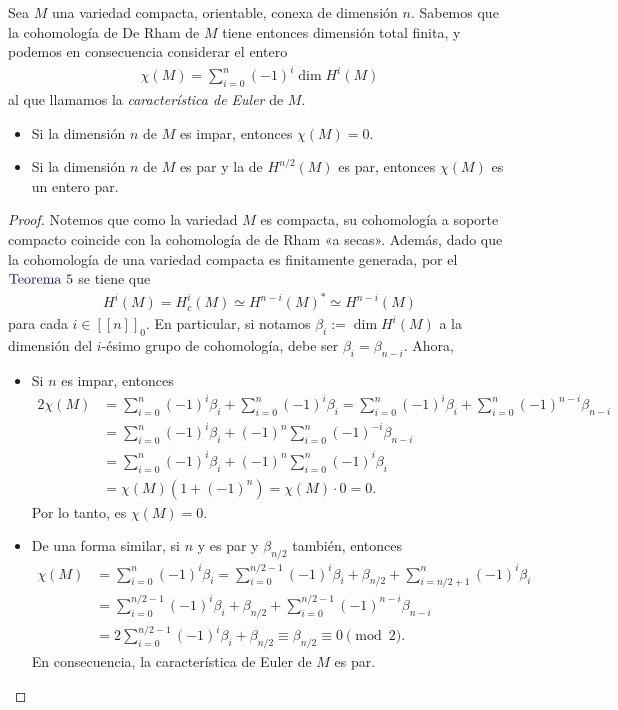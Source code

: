 \documentclass[11pt]{article}
\newcommand{\nat}[1]{[\![#1]\!]}
\newcommand{\natzero}[1]{\nat{#1}_0}
\newcommand{\paint}[1]{\color{color}{#1}}
\newcommand{\tpaing}[1]{\paint{\text{#1}}}
\newenvironment{exercise}[2][Ejercicio]{\begin{trivlist}
\item[\hskip \labelsep \paint{{\bfseries #1}}\hskip \labelsep {\bfseries #2.}]}{\end{trivlist}}
\begin{document}
\begin{exercise}{4} Sea $M$ una variedad compacta, orientable, conexa de dimensión $n$. Sabemos que la cohomología de De Rham de $M$ tiene entonces dimensión total finita, y podemos en consecuencia considerar el entero
\begin{align*}
\chi(M) = \sum_{i=0}^{n}(-1)^i \dim H^i(M)
\end{align*}
al que llamamos la \textit{característica de Euler} de $M$.
\begin{itemize}[listparindent = \parindent]
\item[(a)] Si la dimensión $n$ de $M$ es impar, entonces $\chi(M) = 0$.
\item[(b)] Si la dimensión $n$ de $M$ es par y la de $H^{n/2}(M)$ es par, entonces $\chi(M)$ es un entero par.
\end{itemize}
\end{exercise}
\begin{proof} Notemos que como la variedad $M$ es compacta, su cohomología a soporte compacto coincide con la cohomología de de Rham «a secas». Además, dado que la cohomología de una variedad compacta es finitamente generada, por el $\tpaing{Teorema $5$}$ se tiene que
\begin{align*}
H^i(M) = H^i_c(M) \simeq H^{n-i}(M)^* \simeq H^{n-i}(M) 
\end{align*}
para cada $i \in \natzero{n}$. En particular, si notamos $\beta_i := \dim H^i(M)$ a la dimensión del $i$-ésimo grupo de cohomología, debe ser $\beta_i = \beta_{n-i}$.
Ahora,
\begin{itemize}[listparindent = \parindent]
\item[(a)] Si $n$ es impar, entonces
\begin{align*}
2\chi(M) &= \sum_{i=0}^{n}(-1)^i\beta_i + \sum_{i=0}^{n}(-1)^i\beta_i =
\sum_{i=0}^{n}(-1)^i\beta_i + \sum_{i=0}^{n}(-1)^{n-i}\beta_{n-i}\\
&= \sum_{i=0}^{n}(-1)^i\beta_i + (-1)^n\sum_{i=0}^{n}(-1)^{-i}\beta_{n-i}\\
&= \sum_{i=0}^{n}(-1)^i\beta_i + (-1)^n\sum_{i=0}^{n}(-1)^{i}\beta_{i}\\
&= \chi(M)(1 + (-1)^n) = \chi(M) \cdot  0 = 0.
\end{align*}
Por lo tanto, es $\chi(M) = 0$.
\item[(b)] De una forma similar, si $n$ y es par y $\beta_{n/2}$ también, entonces
\begin{align*}
\chi(M) &= \sum_{i=0}^{n}(-1)^i\beta_i = \sum_{i=0}^{n/2-1}(-1)^i\beta_i + \beta_{n/2} + \sum_{i=n/2+1}^{n}(-1)^i\beta_i\\
&= \sum_{i=0}^{n/2-1}(-1)^i\beta_i + \beta_{n/2} + \sum_{i=0}^{n/2-1}(-1)^{n-i}\beta_{n-i}\\
&= 2\sum_{i=0}^{n/2-1}(-1)^i\beta_i + \beta_{n/2} \equiv \beta_{n/2} \equiv 0 \pmod{2}.
\end{align*}
En consecuencia, la característica de Euler de $M$ es par.
\end{itemize}
\end{proof}
\end{document}
